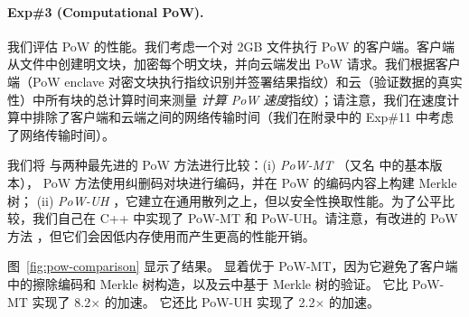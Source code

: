 \paragraph{Exp\#3 (Computational PoW).} 我们评估 PoW 的性能。我们考虑一个对 2GB 文件执行 PoW 的客户端。客户端从文件中创建明文块，加密每个明文块，并向云端发出 PoW 请求。我们根据客户端（PoW enclave 对密文块执行指纹识别并签署结果指纹）和云（验证数据的真实性）中所有块的总计算时间来测量 {\em 计算 PoW 速度}指纹）；请注意，我们在速度计算中排除了客户端和云端之间的网络传输时间（我们在附录中的 Exp\#11 中考虑了网络传输时间）。

我们将 \sysname 与两种最先进的 PoW 方法进行比较：(i) {\em PoW-MT} \cite{halevi11}（又名 \cite{halevi11} 中的基本版本）， PoW 方法使用纠删码对块进行编码，并在 PoW 的编码内容上构建 Merkle 树； (ii) {\em PoW-UH} \cite{xu13}，它建立在通用散列之上，但以安全性换取性能。为了公平比较，我们自己在 C++ 中实现了 PoW-MT 和 PoW-UH。请注意，有改进的 PoW 方法 \cite{halevi11}，但它们会因低内存使用而产生更高的性能开销。


图~\ref{fig:pow-comparison} 显示了结果。 \sysname 显着优于 PoW-MT，因为它避免了客户端中的擦除编码和 Merkle 树构造，以及云中基于 Merkle 树的验证。 它比 PoW-MT 实现了 8.2$\times$ 的加速。 它还比 PoW-UH 实现了 2.2$\times$ 的加速。


